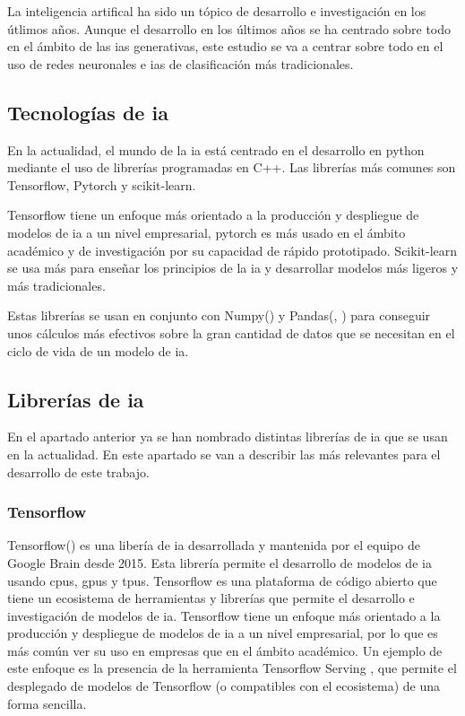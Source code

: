 La inteligencia artifical ha sido un tópico de desarrollo e investigación en los útlimos años. Aunque el desarrollo en los últimos años se ha centrado sobre todo en el ámbito de las \glspl{ia} generativas, este estudio se va a centrar sobre todo en el uso de redes neuronales e \glspl{ia} de clasificación más tradicionales.

\subsection{Tecnologías de \gls{ia}}

En la actualidad, el mundo de la \gls{ia} está centrado en el desarrollo en python mediante el uso de librerías programadas en C++. Las librerías más comunes son Tensorflow, Pytorch y scikit-learn.

Tensorflow tiene un enfoque más orientado a la producción y despliegue de modelos de \gls{ia} a un nivel empresarial, pytorch es más usado en el ámbito académico y de investigación por su capacidad de rápido prototipado. Scikit-learn se usa más para enseñar los principios de la \gls{ia} y desarrollar modelos más ligeros y más tradicionales.

Estas librerías se usan en conjunto con Numpy(\cite{harris2020array}) y Pandas(\cite{reback2020pandas}, \cite{mckinney-proc-scipy-2010}) para conseguir unos cálculos más efectivos sobre la gran cantidad de datos que se necesitan en el ciclo de vida de un modelo de \gls{ia}.

\subsection{Librerías de \gls{ia}}

En el apartado anterior ya se han nombrado distintas librerías de \gls{ia} que se usan en la actualidad. En este apartado se van a describir las más relevantes para el desarrollo de este trabajo.

\subsubsection{Tensorflow}

Tensorflow(\cite{tensorflow2015-whitepaper}) es una libería de \gls{ia} desarrollada y mantenida por el equipo de Google Brain desde 2015. Esta librería permite el desarrollo de modelos de \gls{ia} usando \glspl{cpu}, \glspl{gpu} y \glspl{tpu}. Tensorflow es una plataforma de código abierto que tiene un ecosistema de herramientas y librerías que permite el desarrollo e investigación de modelos de \gls{ia}.
Tensorflow tiene un enfoque más orientado a la producción y despliegue de modelos de \gls{ia} a un nivel empresarial, por lo que es más común ver su uso en empresas que en el ámbito académico. Un ejemplo de este enfoque es la presencia de la herramienta Tensorflow Serving \cite{olston2017tensorflowservingflexiblehighperformanceml}, que permite el desplegado de modelos de Tensorflow (o compatibles con el ecosistema) de una forma sencilla.

